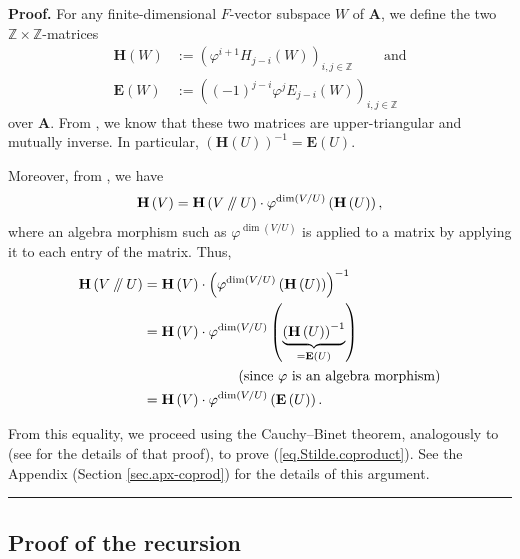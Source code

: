 \documentclass[numbers=enddot,12pt,final,onecolumn,notitlepage]{scrartcl}%
\numberwithin{exer}{section}
\theoremstyle{definition}
\newenvironment{proof}[1][Proof]{\noindent\textbf{#1.} }{\ \rule{0.5em}{0.5em}}
\newcommand{\sslash}{\mathbin{/\mkern-5mu/}}
\theoremstyle{plainsl}
\begin{document}
\begin{proof}
For any finite-dimensional $F$-vector subspace $W$ of $\mathbf{A}$, we define
the two $\mathbb{Z}\times\mathbb{Z}$-matrices%
\begin{align*}
\mathbf{H}\left(  W\right)   &  :=\left(  \varphi^{i+1}H_{j-i}\left(
W\right)  \right)  _{i,j\in\mathbb{Z}}\ \ \ \ \ \ \ \ \ \ \text{and}\\
\mathbf{E}\left(  W\right)   &  :=\left(  \left(  -1\right)  ^{j-i}\varphi
^{j}E_{j-i}\left(  W\right)  \right)  _{i,j\in\mathbb{Z}}%
\end{align*}
over $\mathbf{A}$. From \cite[(7.9)]{Macdon92}, we know that these two
matrices are upper-triangular and mutually inverse. In particular, $\left(
\mathbf{H}\left(  U\right)  \right)  ^{-1}=\mathbf{E}\left(  U\right)  $.

Moreover, from \cite[(7.17) (ii)]{Macdon92}, we have%
\[
\mathbf{H}\left(  V\right)  =\mathbf{H}\left(  V\sslash U\right)  \cdot
\varphi^{\dim\left(  V/U\right)  }\left(  \mathbf{H}\left(  U\right)  \right)
,
\]
where an algebra morphism such as $\varphi^{\dim\left(  V/U\right)  }$ is
applied to a matrix by applying it to each entry of the matrix. Thus,%
\begin{align}
\mathbf{H}\left(  V\sslash U\right)   &  =\mathbf{H}\left(  V\right)
\cdot\left(  \varphi^{\dim\left(  V/U\right)  }\left(  \mathbf{H}\left(
U\right)  \right)  \right)  ^{-1}\nonumber\\
&  =\mathbf{H}\left(  V\right)  \cdot\varphi^{\dim\left(  V/U\right)  }\left(
\underbrace{\left(  \mathbf{H}\left(  U\right)  \right)  ^{-1}}_{=\mathbf{E}%
\left(  U\right)  }\right) \nonumber\\
&  \ \ \ \ \ \ \ \ \ \ \ \ \ \ \ \ \ \ \ \ \left(  \text{since }\varphi\text{
is an algebra morphism}\right) \nonumber\\
&  =\mathbf{H}\left(  V\right)  \cdot\varphi^{\dim\left(  V/U\right)  }\left(
\mathbf{E}\left(  U\right)  \right)  . \label{pf.lem.Stilde.coproduct.HHE}%
\end{align}


From this equality, we proceed using the Cauchy--Binet theorem, analogously to
\cite[proof of (7.18)]{Macdon92} (see \cite[errata, \textquotedblleft page 19,
proof of (6.13)\textquotedblright]{Macdon92} for the details of that proof),
to prove (\ref{eq.Stilde.coproduct}). See the Appendix (Section
\ref{sec.apx-coprod}) for the details of this argument.
\end{proof}

\subsection{Proof of the recursion}
\end{document}
